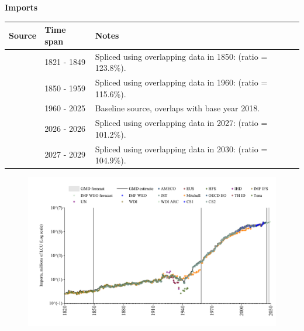 \documentclass[12pt,a4paper,landscape]{article}
\begin{document}
\begin{adjustbox}{max totalsize={\paperwidth}{\paperheight},center}
\begin{minipage}[t][\textheight][t]{\textwidth}
\vspace*{0.5cm}
{}
\begin{center}
{\Large\bfseries Imports}
\end{center}
\vspace{0.5cm}
\begin{table}[H]
\centering
\small
\begin{tabular}{|l|l|l|}
\hline
\textbf{Source} & \textbf{Time span} & \textbf{Notes} \\
\hline
\rowcolor{white}\cite{Tena}& 1821 - 1849 &Spliced using overlapping data in 1850: (ratio = 123.8\%). \\
\rowcolor{lightgray}\cite{CS2_ESP}& 1850 - 1959 &Spliced using overlapping data in 1960: (ratio = 115.6\%). \\
\rowcolor{white}\cite{OECD_EO}& 1960 - 2025 &Baseline source, overlaps with base year 2018. \\
\rowcolor{lightgray}\cite{AMECO}& 2026 - 2026 &Spliced using overlapping data in 2027: (ratio = 101.2\%). \\
\rowcolor{white}\cite{IMF_WEO_forecast}& 2027 - 2029 &Spliced using overlapping data in 2030: (ratio = 104.9\%). \\
\hline
\end{tabular}
\end{table}
\begin{figure}[H]
\centering
\includegraphics[width=\textwidth,height=0.6\textheight,keepaspectratio]{graphs/ESP_imports.pdf}
\end{figure}
\end{minipage}
\end{adjustbox}
\end{document}
